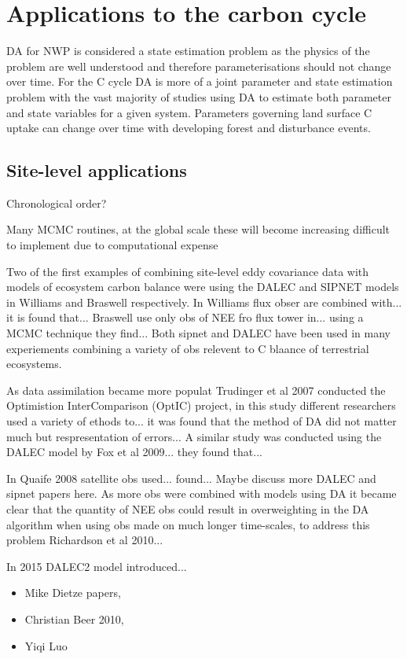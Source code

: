 \documentclass[12pt]{article}
\begin{document}
\section{Applications to the carbon cycle}

DA for NWP is considered a state estimation problem as the physics of the problem are well understood and therefore parameterisations should not change over time. For the C cycle DA is more of a joint parameter and state estimation problem with the vast majority of studies using DA to estimate both parameter and state variables for a given system. Parameters governing land surface C uptake can change over time with developing forest and disturbance events.  

\subsection{Site-level applications}

Chronological order?

Many MCMC routines, at the global scale these will become increasing difficult to implement due to computational expense

Two of the first examples of combining site-level eddy covariance data with models of ecosystem carbon balance were using the DALEC and SIPNET models in Williams and Braswell respectively. In Williams flux obser are combined with... it is found that... Braswell use only obs of NEE fro flux tower in... using a MCMC technique they find...
Both sipnet and DALEC have been used in many experiements combining a variety of obs relevent to C blaance of terrestrial ecosystems. 

As data assimilation became more populat Trudinger et al 2007 conducted the Optimistion InterComparison (OptIC) project, in this study different researchers used a variety of ethods to... it was found that the method of DA did not matter much but respresentation of errors...
A similar study was conducted using the DALEC model by Fox et al 2009... they found that...

In Quaife 2008 satellite obs used... found... Maybe discuss more DALEC and sipnet papers here. As more obs were combined with models using DA it became clear that the quantity of NEE obs could result in overweighting in the DA algorithm when using obs made on much longer time-scales, to address this problem Richardson et al 2010...

In 2015 DALEC2 model introduced...

\begin{itemize}
\item Mike Dietze papers, 
\item Christian Beer 2010, 
\item Yiqi Luo
\end{itemize}
\end{document}
